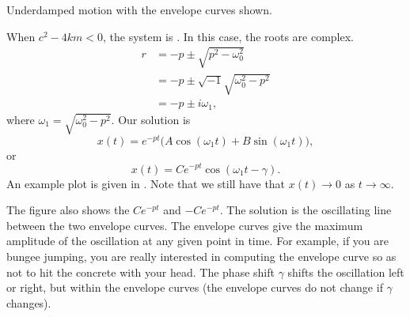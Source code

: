 \begin{mywrapfig}[13]{3.25in}
\capstart
{}
\caption{Underdamped motion with the envelope curves shown.\label{mv:underdampedfig}}
\end{mywrapfig}
%
%
When
$c^2 - 4km < 0$, the system is \emph{}.  In this case,
the roots are complex.
\begin{equation*}
\begin{split}
r & =
-p \pm \sqrt{p^2 - \omega_0^2} \\
& = 
-p \pm \sqrt{-1}\sqrt{\omega_0^2 - p^2} \\
& = 
-p \pm i \omega_1 ,
\end{split}
\end{equation*}
where $\omega_1 =\sqrt{\omega_0^2 - p^2}$.  Our solution is
\begin{equation*}
x(t) = e^{-pt} \bigl( A \cos (\omega_1 t) + B \sin (\omega_1 t) \bigr) ,
\end{equation*}
or
\begin{equation*}
x(t) = C e^{-pt} \cos ( \omega_1 t - \gamma ) .
\end{equation*}
An example plot is given in .  Note that we
still have that $x(t) \to 0$ as $t \to \infty$.


The figure also 
shows the \emph{}
$C e^{-pt}$ and $-C e^{-pt}$.  The solution
is the oscillating line between the two envelope curves.
The envelope curves give
the maximum amplitude of the oscillation at any given point in time.  For
example, if you are bungee jumping, you are really interested in computing the
envelope curve so as not to hit the concrete with your head.
%
The phase shift $\gamma$ shifts the oscillation left or right, but within the
envelope curves (the envelope curves do not change if $\gamma$
changes).


